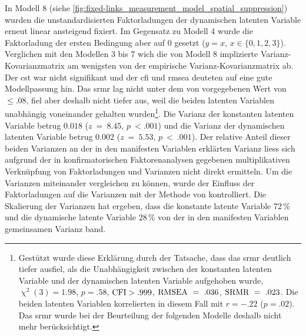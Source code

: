 \documentclass[11pt, twoside, a4paper]{book}		%
\begin{document}
In Modell 8 (siehe \autoref{fig:fixed-links_measurement_model_spatial_suppression}) wurden die unstandardisierten Faktorladungen der dynamischen latenten Variable erneut linear ansteigend fixiert.
Im Gegensatz zu Modell 4 wurde die Faktorladung der ersten Bedingung aber auf 0 gesetzt ($y=x,\,x\in\{0, 1, 2, 3\}$).
Verglichen mit den Modellen 3 bis 7 wich die von Modell 8 implizierte Var\-ianz-Ko\-var\-ianz\-ma\-trix am wenigsten von der empirische Var\-ianz-Ko\-var\-ianz\-ma\-trix ab. Der \gls{cst} war nicht signifikant und der \gls{cfi} und \gls{rmsea} deuteten auf eine gute Modellpassung hin. 
Das \gls{srmr}  lag nicht unter dem von \citet{Hu1999} vorgegebenen Wert von $\leq.08$, fiel aber deshalb  nicht tiefer aus, weil die beiden latenten Variablen unabhängig voneinander gehalten wurden\footnote{Gestützt wurde diese Erklärung durch der Tatsache, dass das \gls{srmr} deutlich tiefer ausfiel, als die Unabhängigkeit zwischen der konstanten latenten Variable und der dynamischen latenten Variable aufgehoben wurde, $\upchi^2(3)=1.98$, $p=.58$, $\textnormal{CFI}>.999$, $\textnormal{RMSEA}~=~.036$, $\textnormal{SRMR}~=~.023$. Die beiden latenten Variablen korrelierten in diesem Fall mit $r=-.22$ ($p=.02$). Das \gls{srmr} wurde bei der Beurteilung der folgenden Modelle deshalb nicht mehr berücksichtigt.}. 
Die Varianz der konstanten latenten Variable betrug $0.018$ ($z~=~8.45$, $p~<.001$) und die Varianz der dynamischen latenten Variable betrug $0.002$ ($z~=~5.53$, $p~<~.001$). 
Der relative Anteil dieser beiden Varianzen an der in den manifesten Variablen erklärten Varianz liess sich aufgrund der in konfirmatorischen Faktorenanalysen gegebenen multiplikativen Verknüpfung von Faktorladungen und Varianzen nicht direkt ermitteln. Um die Varianzen miteinander vergleichen zu können, wurde der Einfluss der Faktorladungen auf die Varianzen mit der Methode von  \citet{Schweizer2011a} kontrolliert. Die Skalierung der Varianzen hat ergeben, dass die konstante latente Variable 72\,\% und die dynamische latente Variable 28\,\% von der in den manifesten Variablen gemeinsamen Varianz band.
\end{document}
